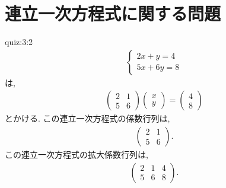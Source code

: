 \section{連立一次方程式に関する問題}
\begin{answerof}{quiz:3:2}
  \begin{align*}
    \begin{cases}
      2x+y=4\\
      5x+6y=8
      \end{cases}
  \end{align*}
  は,
  \begin{align*}
    \begin{pmatrix}
      2&1\\5&6
    \end{pmatrix}
    \begin{pmatrix}
      x\\y
    \end{pmatrix}
    =
    \begin{pmatrix}
      4\\8
    \end{pmatrix}
  \end{align*}
  とかける.
  この連立一次方程式の係数行列は,
  \begin{align*}
    \begin{pmatrix}
      2&1\\5&6
    \end{pmatrix}.
  \end{align*}
  この連立一次方程式の拡大係数行列は,
  \begin{align*}
    \begin{pmatrix}
      2&1&4\\5&6&8
    \end{pmatrix}.
  \end{align*}


\end{answerof}
